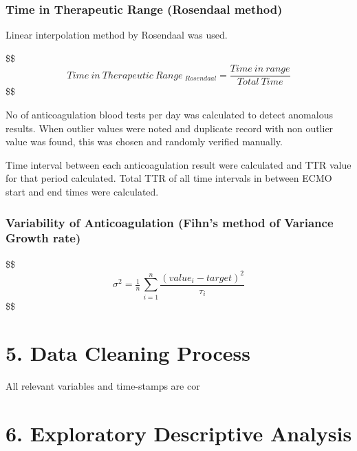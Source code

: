 \documentclass[
]{article}
\begin{document}
\hypertarget{time-in-therapeutic-range-rosendaal-method}{%
\subsubsection{Time in Therapeutic Range (Rosendaal
method)}\label{time-in-therapeutic-range-rosendaal-method}}

Linear interpolation method by Rosendaal was used.

\$\$\begin{equation}

Time\ in\ Therapeutic\ Range\ _{Rosendaal} = \frac{Time\ in\ range}{Total\ Time }
\end{equation}\$\$

No of anticoagulation blood tests per day was calculated to detect
anomalous results. When outlier values were noted and duplicate record
with non outlier value was found, this was chosen and randomly verified
manually.

Time interval between each anticoagulation result were calculated and
TTR value for that period calculated. Total TTR of all time intervals in
between ECMO start and end times were calculated.

\hypertarget{variability-of-anticoagulation-fihns-method-of-variance-growth-rate}{%
\subsubsection{Variability of Anticoagulation (Fihn's method of Variance
Growth
rate)}\label{variability-of-anticoagulation-fihns-method-of-variance-growth-rate}}

\$\$\begin{equation}

\sigma ^{2} = \tfrac{1}{n}\tfrac{}{} \sum_{i = 1}^{n} \frac{(value_{i} - target)^{2}}{\tau _{i}}

\end{equation}\$\$

\hypertarget{data-cleaning-process}{%
\section{5. Data Cleaning Process}\label{data-cleaning-process}}

All relevant variables and time-stamps are cor

\hypertarget{exploratory-descriptive-analysis}{%
\section{6. Exploratory Descriptive
Analysis}\label{exploratory-descriptive-analysis}}
\end{document}
